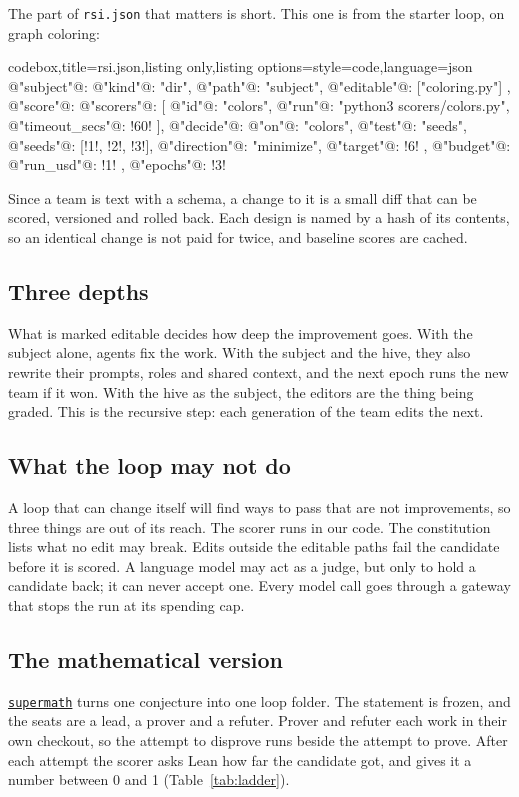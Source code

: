 \documentclass[11pt]{amsart}
\newcommand{\lean}[1]{\texttt{#1}}
\newcommand{\trepo}[1]{\href{https://github.com/tinyhumansai/#1}{\texttt{#1}}}
\begin{document}
\noindent The part of \lean{rsi.json} that matters is short. This one is from the starter loop, on graph coloring:
\begin{tcblisting}{codebox,title=rsi.json,listing only,listing options={style=code,language=json}}
@"subject"@: {
  @"kind"@: "dir",
  @"path"@: "subject",
  @"editable"@: ["coloring.py"]
},
@"score"@: {
  @"scorers"@: [
    { @"id"@: "colors", @"run"@: "python3 scorers/colors.py", @"timeout_secs"@: !60! }
  ],
  @"decide"@: {
    @"on"@: "colors", @"test"@: "seeds", @"seeds"@: [!1!, !2!, !3!],
    @"direction"@: "minimize", @"target"@: !6!
  }
},
@"budget"@: { @"run_usd"@: !1! },
@"epochs"@: !3!
\end{tcblisting}
\noindent Since a team is text with a schema, a change to it is a small diff that can be scored, versioned and rolled back. Each design is named by a hash of its contents, so an identical change is not paid for twice, and baseline scores are cached.

\subsection*{Three depths} What is marked editable decides how deep the improvement goes. With the subject alone, agents fix the work. With the subject and the hive, they also rewrite their prompts, roles and shared context, and the next epoch runs the new team if it won. With the hive as the subject, the editors are the thing being graded. This is the recursive step: each generation of the team edits the next.

\subsection*{What the loop may not do} A loop that can change itself will find ways to pass that are not improvements, so three things are out of its reach. The scorer runs in our code. The constitution lists what no edit may break. Edits outside the editable paths fail the candidate before it is scored. A language model may act as a judge, but only to hold a candidate back; it can never accept one. Every model call goes through a gateway that stops the run at its spending cap.

\subsection*{The mathematical version} \trepo{supermath} \cite{supermath} turns one conjecture into one loop folder. The statement is frozen, and the seats are a lead, a prover and a refuter. Prover and refuter each work in their own checkout, so the attempt to disprove runs beside the attempt to prove. After each attempt the scorer asks Lean how far the candidate got, and gives it a number between 0 and 1 (Table~\ref{tab:ladder}).
\end{document}

